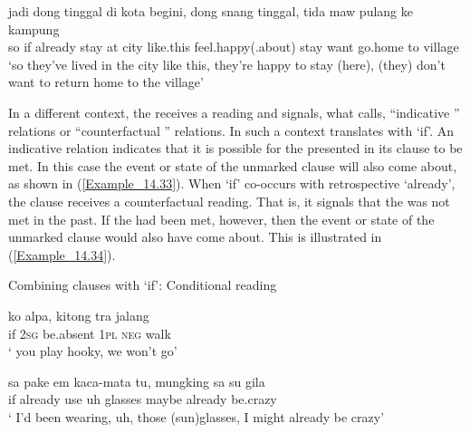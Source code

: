 \ea
\label{Example_14.32}
\gll       jadi    dong    tinggal  di  kota  begini,  dong   snang  tinggal,  tida  maw  pulang  ke  kampung\\  
so  if    already  stay  at  city  like.this     feel.happy(.about)  stay    want  go.home  to  village\\
\glt ‘so  they’ve lived in the city like this, they’re happy to stay (here), (they) don’t want to return home to the village’ \textstyleExampleSource{[080927-009-CvNP.0059]}
\z

In a different context, the  receives a  reading and signals, what \citet[6]{Kaufmann.2006} calls, ``indicative '' relations or ``counterfactual '' relations. In such a context  translates with ‘if’. An indicative  relation indicates that it is possible for the  presented in its clause to be met. In this case the event or state of the unmarked clause will also come about, as shown in (\ref{Example_14.33}). When   ‘if’ co-occurs with retrospective  ‘already’, the clause receives a counterfactual  reading. That is, it signals that the  was not met in the past. If the  had been met, however, then the event or state of the unmarked clause would also have come about. This is illustrated in (\ref{Example_14.34}).

\begin{styleExampleTitle}
Combining clauses with  ‘if’: Conditional reading
\end{styleExampleTitle}
\ea
\label{Example_14.33}
 {ko} {alpa,} {kitong} {tra} {jalang}\\ %
 if  \textsc{2sg}  be.absent  \textsc{1pl}  \textsc{neg}  walk\\
 ‘ you play hooky, we won’t go’ \textstyleExampleSource{[080917-003a-CvEx.0038]}
\z

\ea
\label{Example_14.34}

\gll       {}  sa    pake  em  kaca-mata  tu, mungking  sa  su  gila\\  
if    already  use  uh  glasses     maybe    already  be.crazy\\
\glt ‘ I’d been wearing, uh, those (sun)glasses, I might already be crazy’ \textstyleExampleSource{[080919-005-Cv.0007]}
\z

